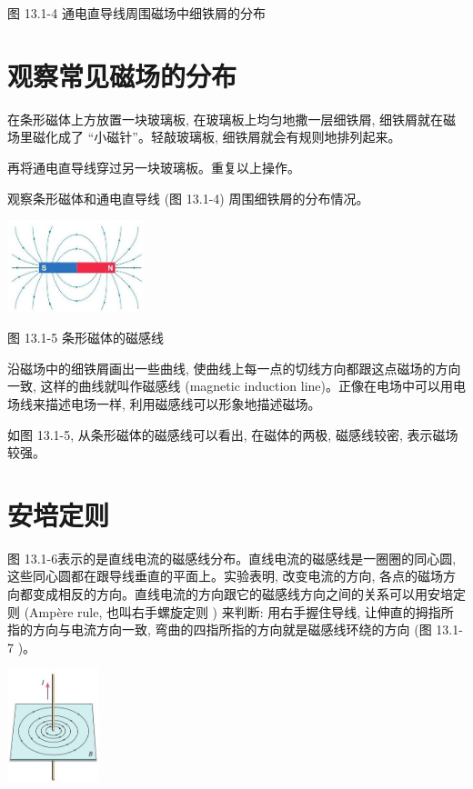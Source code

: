 \documentclass[10pt]{article}
\begin{document}
图 13.1-4 通电直导线周围磁场中细铁屑的分布

\section*{观察常见磁场的分布}

在条形磁体上方放置一块玻璃板, 在玻璃板上均匀地撒一层细铁屑, 细铁屑就在磁场里磁化成了 “小磁针”。轻敲玻璃板, 细铁屑就会有规则地排列起来。

再将通电直导线穿过另一块玻璃板。重复以上操作。

观察条形磁体和通电直导线 (图 13.1-4) 周围细铁屑的分布情况。

\begin{center}
\includegraphics[max width=0.3\textwidth]{images/01911d5f-8e38-70c0-b5b8-2b399bd115b6_111_581191.jpg}
\end{center}

图 13.1-5 条形磁体的磁感线

沿磁场中的细铁屑画出一些曲线, 使曲线上每一点的切线方向都跟这点磁场的方向一致, 这样的曲线就叫作磁感线 (magnetic induction line)。正像在电场中可以用电场线来描述电场一样, 利用磁感线可以形象地描述磁场。

如图 13.1-5, 从条形磁体的磁感线可以看出, 在磁体的两极, 磁感线较密, 表示磁场较强。

\section*{安培定则}

图 13.1-6表示的是直线电流的磁感线分布。直线电流的磁感线是一圈圈的同心圆, 这些同心圆都在跟导线垂直的平面上。实验表明, 改变电流的方向, 各点的磁场方向都变成相反的方向。直线电流的方向跟它的磁感线方向之间的关系可以用安培定则 (Ampère rule, 也叫右手螺旋定则 ) 来判断: 用右手握住导线, 让伸直的拇指所指的方向与电流方向一致, 弯曲的四指所指的方向就是磁感线环绕的方向 (图 13.1-7 )。

\begin{center}
\includegraphics[max width=0.2\textwidth]{images/01911d5f-8e38-70c0-b5b8-2b399bd115b6_111_824958.jpg}
\end{center}
\end{document}
